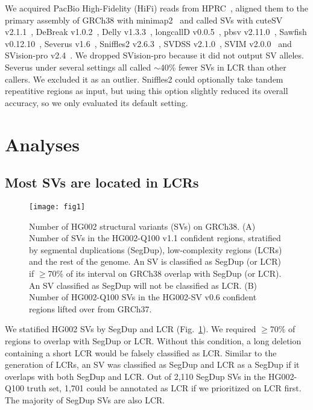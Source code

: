 \documentclass[a4paper,num-refs]{oup-contemporary}
\begin{document}
We acquired PacBio High-Fidelity (HiFi) reads from HPRC~\cite{hifi-read},
aligned them to the primary assembly of GRCh38 with minimap2~\cite{Li:2018ab}
and called SVs with
cuteSV v2.1.1~\cite{Jiang:2020aa},
DeBreak v1.0.2~\cite{Chen:2023aa},
Delly v1.3.3~\cite{Rausch:2012aa},
longcallD v0.0.5~\cite{longcalld},
pbsv v2.11.0~\cite{pbsv},
Sawfish v0.12.10~\cite{Saunders:2025aa},
Severus v1.6~\cite{Keskus:2025aa},
Sniffles2 v2.6.3~\cite{Smolka:2024ab},
SVDSS v2.1.0~\cite{Denti:2023aa},
SVIM v2.0.0~\cite{Heller:2019aa}
and SVision-pro v2.4~\cite{Wang:2025aa}.
We dropped SVision-pro because it did not output SV alleles.
Severus under several settings all called $\sim$40\% fewer SVs in LCR than other callers.
We excluded it as an outlier.
Sniffles2 could optionally take tandem repeatitive regions as input,
but using this option slightly reduced its overall accuracy, so we only evaluated its default setting.

\section{Analyses}

\subsection{Most SVs are located in LCRs}

\begin{figure}[tb]
\texttt{[image: fig1]}
\caption{Number of HG002 structural variants (SVs) on GRCh38.
(A) Number of SVs in the HG002-Q100 v1.1 confident regions,
stratified by segmental duplications (SegDup),
low-complexity regions (LCRs) and the rest of the genome.
An SV is classified as SegDup (or LCR) if $\ge$70\% of its interval on GRCh38 overlap with SegDup (or LCR).
An SV classified as SegDup will not be classified as LCR.
(B) Number of HG002-Q100 SVs in the HG002-SV v0.6 confident regions lifted over from GRCh37.}\label{fig:count}
\end{figure}

We statified HG002 SVs by SegDup and LCR (Fig.~\ref{fig:count}).
We required $\ge$70\% of regions to overlap with SegDup or LCR.
Without this condition, a long deletion containing a short LCR would be falsely classified as LCR.
Similar to the generation of LCRs, an SV was classified as SegDup and LCR as a SegDup if it overlaps with both SegDup and LCR.
Out of 2,110 SegDup SVs in the HG002-Q100 truth set, 1,701 could be annotated as LCR if we prioritized on LCR first.
The majority of SegDup SVs are also LCR.
\end{document}
